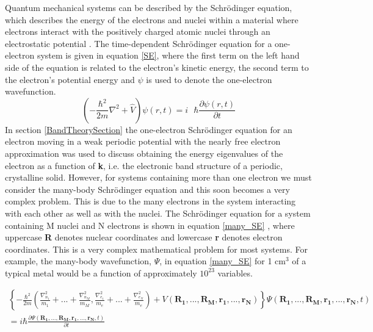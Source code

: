 \documentclass[11pt, twoside]{report}
\begin{document}
Quantum mechanical systems can be described by the Schr{\"o}dinger equation, which describes the energy of the electrons and nuclei within a material where electrons interact with the positively charged atomic nuclei through an electrostatic potential \cite{Lesar}. The time-dependent Schr{\"o}dinger equation for a one-electron system is given in equation \ref{SE}, where the first term on the left hand side of the equation is related to the electron's kinetic energy, the second term to the electron's potential energy and $\psi$ is used to denote the one-electron wavefunction.
\begin{equation} \label{SE}
\left( - \frac{\hbar^2}{2m} \nabla^2 + \hat{V} \right)\psi(r,t) = i\text{ } \hbar\frac{\partial \psi(r,t)}{\partial t}
\end{equation}
In section \ref{BandTheorySection} the one-electron Schr{\"o}dinger equation for an electron moving in a weak periodic potential with the nearly free electron approximation was used to discuss obtaining the energy eigenvalues of the electron as a function of \textbf{k}, i.e. the electronic band structure of a periodic, crystalline solid.
However, for systems containing more than one electron we must consider the many-body Schr{\"o}dinger equation and this soon becomes a very complex problem. This is due to the many electrons in the system interacting with each other as well as with the nuclei. The Schr{\"o}dinger equation for a system containing M nuclei and N electrons is shown in equation \ref{many_SE} \cite{Lesar}, where uppercase \textbf{R} denotes nuclear coordinates and lowercase \textbf{r} denotes electron coordinates. This is a very complex mathematical problem for most systems. For example, the many-body wavefunction, $\Psi$, in equation \ref{many_SE} for 1 cm$^3$ of a typical metal would be a function of approximately $10^{23}$ variables.

\begin{multline}  \label{many_SE}
\left\{ - \frac{\hbar^2}{2m} \left( \frac{\nabla_{n_1}^2}{m_1} + ... + \frac{\nabla_{n_M}^2}{m_M}, 
\frac{\nabla_{e_1}^2}{m_e} + ... + \frac{\nabla_{e_N}^2}{m_e} \right)
+ V \left( \mathbf{R_1},...,\mathbf{R_M}, \mathbf{r_1}, ..., \mathbf{r_N} \right)
\right\}
\Psi (\mathbf{R_1},...,\mathbf{R_M}, \mathbf{r_1}, ..., \mathbf{r_N}, t) \\
= i\hbar \frac{\partial\Psi(\mathbf{R_1},...,\mathbf{R_M}, \mathbf{r_1}, ..., \mathbf{r_N},t)}{\partial t}
\end{multline}
\end{document}
